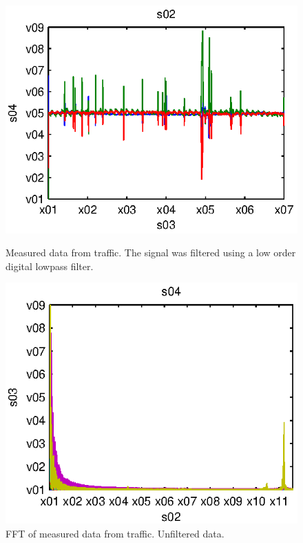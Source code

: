 \begin{subfigures}
\begin{figure}[!htbf]
  \centering
  \begin{minipage}{0.45\linewidth}
  \centering
   
   \includegraphics[width=\linewidth]{images/traffic_data_filt}
  \caption[Measured data from traffic.]{Measured data from traffic. The signal was filtered using a low order digital lowpass filter.}
  \label{fig-traffic}
  \end{minipage}\hfill
  \begin{minipage}{0.45\linewidth}
   \centering
     
   \includegraphics[width=\linewidth]{images/traffic_data_fft}
  \caption[FFT of measured data from traffic.]{FFT of measured data from traffic. Unfiltered data.}
  \label{fig-traffic_fft}
  \end{minipage}
 \end{figure}
\end{subfigures}

